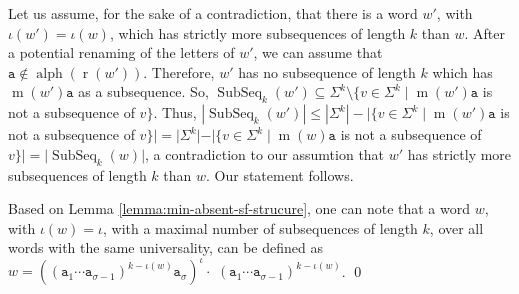 \documentclass[10pt,a4paper]{amsart}
\makeatletter
\def\ta{\mathtt{a}}
\def\r{\operatorname{r}}
\def\m{\operatorname{m}}
\DeclareMathOperator{\al}{alph}
\DeclareMathOperator\ScatFact{SubSeq}
\theoremstyle{plain}
\theoremstyle{definition}
\renewenvironment{proof}[1][\proofname]{\par
  \pushQED{}%
  \normalfont \topsep6\p@\@plus6\p@\relax
  \trivlist
  \item[\hskip\labelsep\itshape #1\@addpunct{.}]\ignorespaces
}{%
  \popQED\endtrivlist\@endpefalse
}
\makeatother
\begin{document}
\begin{proof}
Let us assume, for the sake of a contradiction, that there is a word $w'$, with $\iota(w')=\iota(w)$, which has strictly more subsequences of length $k$ than $w$. After a potential renaming of the letters of $w'$, we can assume that $\ta\notin \al(\r(w'))$. Therefore, $w'$ has no subsequence of length $k$ which has $\m(w')\ta$ as a subsequence. So, $\ScatFact_k(w')\subseteq \Sigma^k \setminus \{v\in \Sigma^k\mid \m(w')\ta$ is not a subsequence of $v\}$. Thus, $|\ScatFact_k(w')|\leq |\Sigma^k| - |\{v\in \Sigma^k\mid \m(w')\ta$ is not a subsequence of $v\}|=  |\Sigma^k| - |\{v\in \Sigma^k\mid \m(w)\ta$ is not a subsequence of $v\}|=|\ScatFact_k(w)|$, a contradiction to our assumtion that $w'$ has strictly more subsequences of length $k$ than $w$. Our statement follows. 

Based on Lemma \ref{lemma:min-absent-sf-strucure}, one can note that a word $w$, with $\iota(w)=\iota$, with a maximal number of subsequences of length $k$, over all words with the same universality, can be defined as $w=((\ta_1 \cdots \ta_{\sigma-1})^{k-\iota(w)} \ta_\sigma)^\iota \cdot$  $(\ta_1 \cdots \ta_{\sigma-1})^{k-\iota(w)}$. \qed
 \end{proof}

\fi
\end{document}

